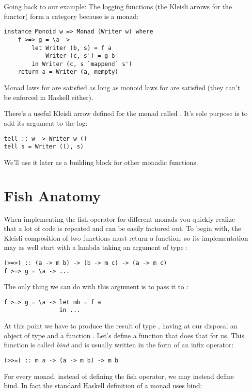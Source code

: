 Going back to our  example: The logging functions (the
Kleisli arrows for the  functor) form a category because
 is a monad:

\begin{Verbatim}
instance Monoid w => Monad (Writer w) where
    f >=> g = \a ->
        let Writer (b, s) = f a
            Writer (c, s') = g b
        in Writer (c, s `mappend` s')
    return a = Writer (a, mempty)
\end{Verbatim}
Monad laws for  are satisfied as long as monoid laws
for  are satisfied (they can't be enforced in Haskell either).

There's a useful Kleisli arrow defined for the  monad
called . It's sole purpose is to add its argument to the
log:

\begin{Verbatim}[commandchars=\\\{\}]
tell :: w -> Writer w ()
tell s = Writer ((), s)
\end{Verbatim}
We'll use it later as a building block for other monadic functions.

\section{Fish Anatomy}\label{fish-anatomy}

When implementing the fish operator for different monads you quickly
realize that a lot of code is repeated and can be easily factored out.
To begin with, the Kleisli composition of two functions must return a
function, so its implementation may as well start with a lambda taking
an argument of type :

\begin{Verbatim}
(>=>) :: (a -> m b) -> (b -> m c) -> (a -> m c)
f >=> g = \a -> ...
\end{Verbatim}
The only thing we can do with this argument is to pass it to :

\begin{Verbatim}
f >=> g = \a -> let mb = f a
                in ...
\end{Verbatim}
At this point we have to produce the result of type ,
having at our disposal an object of type  and a function
. Let's define a function that
does that for us. This function is called \emph{bind} and is usually written in
the form of an infix operator:

\begin{Verbatim}[commandchars=\\\{\}]
(>>=) :: m a -> (a -> m b) -> m b
\end{Verbatim}
For every monad, instead of defining the fish operator, we may instead
define bind. In fact the standard Haskell definition of a monad uses
bind:

